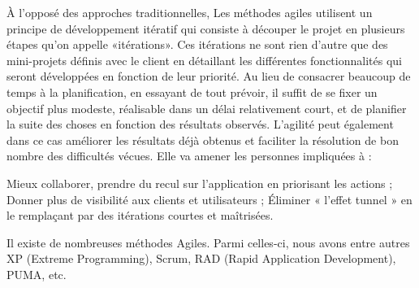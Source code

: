 À l’opposé des approches traditionnelles, Les méthodes agiles utilisent un principe de développement itératif qui consiste à découper le projet en plusieurs étapes qu’on appelle «itérations». Ces itérations ne sont rien d’autre que des mini-projets définis avec le client en détaillant les différentes fonctionnalités qui seront développées en fonction de leur priorité. Au lieu de consacrer beaucoup de temps à la planification, en essayant de tout prévoir, il suffit de se fixer un objectif plus modeste, réalisable dans un délai relativement court, et de planifier la suite des choses en fonction des résultats observés. L’agilité peut également dans ce cas améliorer les résultats déjà obtenus et faciliter la résolution de bon nombre des difficultés vécues. Elle va amener les personnes impliquées à :
\begin{itemize}
	\itemtirait Mieux collaborer, prendre du recul sur l’application en priorisant les actions ;
	\itemtirait Donner plus de visibilité aux clients et utilisateurs ;
	\itemtirait Éliminer « l’effet tunnel »  en le remplaçant par des itérations courtes et maîtrisées.
\end{itemize}
Il existe de nombreuses méthodes Agiles. Parmi celles-ci, nous avons entre autres XP (Extreme Programming), Scrum, RAD (Rapid Application Development), PUMA, etc.
